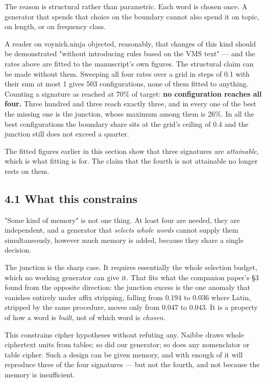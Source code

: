 \documentclass[11pt,a4paper]{article}
\begin{document}
The reason is structural rather than parametric. Each word is chosen once. A generator that spends that choice on the boundary cannot also spend it on topic, on length, or on frequency class.


A reader on voynich.ninja objected, reasonably, that changes of this kind should be demonstrated "without introducing rules based on the VMS text" --- and the rates above are fitted to the manuscript's own figures. The structural claim can be made without them. Sweeping all four rates over a grid in steps of 0.1 with their sum at most 1 gives 503 configurations, none of them fitted to anything. Counting a signature as reached at 70\% of target: \textbf{no configuration reaches all four.} Three hundred and three reach exactly three, and in every one of the best the missing one is the junction, whose maximum among them is 26\%. In all the best configurations the boundary share sits at the grid's ceiling of 0.4 and the junction still does not exceed a quarter.


The fitted figures earlier in this section show that three signatures are \emph{attainable}, which is what fitting is for. The claim that the fourth is not attainable no longer rests on them.


\subsection*{4.1 What this constrains}


"Some kind of memory" is not one thing. At least four are needed, they are independent, and a generator that \emph{selects whole words} cannot supply them simultaneously, however much memory is added, because they share a single decision.


The junction is the sharp case. It requires essentially the whole selection budget, which no working generator can give it. That fits what the companion paper's \S3 found from the opposite direction: the junction excess is the one anomaly that vanishes entirely under affix stripping, falling from 0.194 to 0.036 where Latin, stripped by the same procedure, moves only from 0.047 to 0.043. It is a property of how a word is \emph{built}, not of which word is \emph{chosen}.


This constrains cipher hypotheses without refuting any. Naibbe draws whole ciphertext units from tables; so did our generator; so does any nomenclator or table cipher. Such a design can be given memory, and with enough of it will reproduce three of the four signatures --- but not the fourth, and not because the memory is insufficient.
\end{document}
